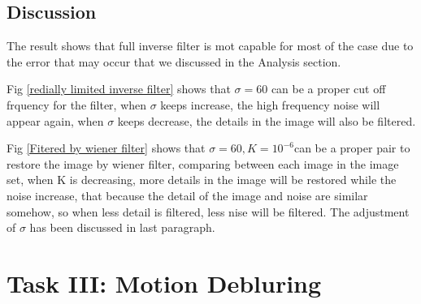 \documentclass[
	12pt, %
]{style/fphw}
\begin{document}
\subsection*{Discussion}

The result shows that full inverse filter is mot capable for most of the case due to the error that may occur that we discussed in the Analysis section. 

Fig \ref{redially limited inverse filter} shows that $\sigma=60$ can be a proper cut off frquency for the filter, when $\sigma$ keeps increase, the high frequency noise will appear again, when $\sigma$ keeps decrease, the details in the image will also be filtered.

Fig \ref{Fitered by wiener filter} shows that $\sigma=60, K = 10^{-6}$can be a proper pair to restore the image by wiener filter, comparing between each image in the image set, when K is decreasing, more details in the image will be restored while the noise increase, that because the detail of the image and noise are similar somehow, so when less detail is filtered, less nise will be filtered. The adjustment of $\sigma$ has been discussed in last paragraph. 

\section*{Task III: Motion Debluring}
\end{document}
